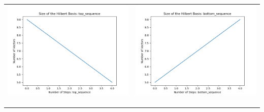 \documentclass[10pt]{article}
\begin{document}
\begin{tabular}{c|c}
\begin{minipage}{.4\textwidth}
\includegraphics[width=\textwidth]{"DATA/5d/5 generators 1 bound G/top_sequence SIZE"}
\end{minipage} &
\begin{minipage}{.4\textwidth}
\includegraphics[width=\textwidth]{"DATA/5d/5 generators 1 bound G bottomup/bottom_sequence SIZE"}
\end{minipage} \\ \\
\hline \\\begin{minipage}{.4\textwidth}

\end{minipage}
\end{tabular}
\end{document}
